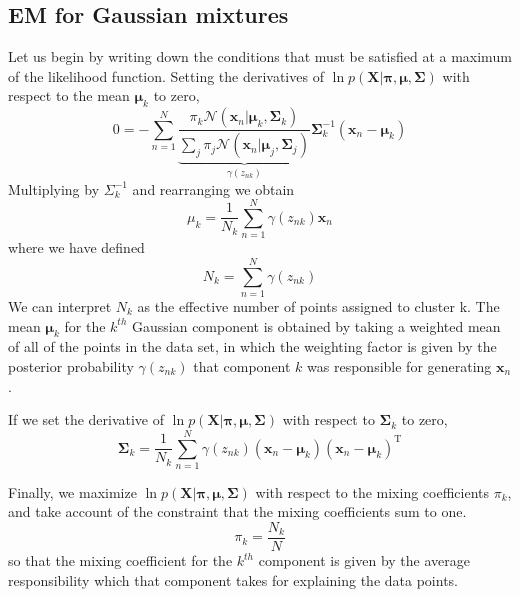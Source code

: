 \documentclass[5p,sort&compress]{elsarticle}
\begin{document}
\subsection{EM for Gaussian mixtures}

Let us begin by writing down the conditions that must be satisfied at a maximum of the likelihood function. Setting the derivatives of $\ln{p(\mathbf{X}|\boldsymbol{\pi}, \boldsymbol{\mu}, \boldsymbol{\Sigma})}$ with respect to the mean $\boldsymbol{\mu}_k$ to zero,
\begin{equation}
0=-\sum_{n=1}^{N} \underbrace{\frac{\pi_{k} \mathcal{N}\left(\mathbf{x}_{n} | \boldsymbol{\mu}_{k}, \mathbf{\Sigma}_{k}\right)}{\sum_{j} \pi_{j} \mathcal{N}\left(\mathbf{x}_{n} | \boldsymbol{\mu}_{j}, \mathbf{\Sigma}_{j}\right)}}_{\gamma\left(z_{n k}\right)} \boldsymbol{\Sigma}_{k}^{-1}\left(\mathbf{x}_{n}-\boldsymbol{\mu}_{k}\right)
\end{equation}
Multiplying by $\Sigma_k^{-1}$ and rearranging we obtain
\begin{equation}
\mu_{k}=\frac{1}{N_{k}} \sum_{n=1}^{N} \gamma\left(z_{n k}\right) \mathbf{x}_{n}
\end{equation}
where we have defined
\begin{equation}
N_{k}=\sum_{n=1}^{N} \gamma\left(z_{n k}\right)
\end{equation}
We can interpret $N_k$ as the effective number of points assigned to cluster k. The mean $\boldsymbol{\mu}_k$ for the $k^{th}$ Gaussian component is obtained by taking a weighted mean of all of the points in the data set, in which the weighting factor is given by the posterior probability $\gamma(z_{nk})$ that component $k$ was responsible for generating $\mathbf{x}_n$.

If we set the derivative of $\ln{p(\mathbf{X}|\boldsymbol{\pi}, \boldsymbol{\mu}, \boldsymbol{\Sigma})}$ with respect to $\boldsymbol{\Sigma}_k$ to zero,
\begin{equation}
\mathbf{\Sigma}_{k}=\frac{1}{N_{k}} \sum_{n=1}^{N} \gamma\left(z_{n k}\right)\left(\mathbf{x}_{n}-\boldsymbol{\mu}_{k}\right)\left(\mathbf{x}_{n}-\boldsymbol{\mu}_{k}\right)^{\mathrm{T}}
\end{equation}

Finally, we maximize $\ln{p(\mathbf{X}|\boldsymbol{\pi}, \boldsymbol{\mu}, \boldsymbol{\Sigma})}$ with respect to the mixing coefficients $\pi_k$, and take account of the constraint that the mixing coefficients sum to one. 
\begin{equation}
\pi_{k}=\frac{N_{k}}{N}
\end{equation}
so that the mixing coefficient for the $k^{th}$ component is given by the average responsibility which that component takes for explaining the data points.
\end{document}
